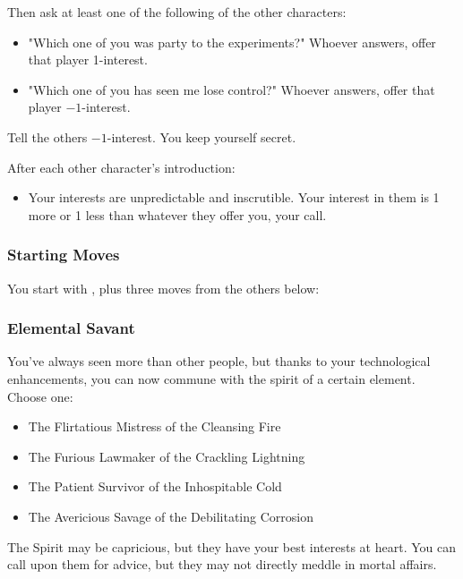 Then ask at least one of the following of the other characters:
\begin{itemize}
\item "Which one of you was party to the experiments?" Whoever answers, offer that player 1-interest.
\item "Which one of you has seen me lose control?" Whoever answers, offer that player $-1$-interest.
\end{itemize}
Tell the others $-1$-interest. You keep yourself secret.

After each other character's introduction:
\begin{itemize}
\item Your interests are unpredictable and inscrutible. Your interest in them is 1 more or 1 less than whatever they offer you, your call.
\end{itemize}

\subsubsection{Starting Moves}
You start with , plus three moves from the others below:

\subsubsection{Elemental Savant}\label{sec:Elemental Savant}
You've always seen more than other people, but thanks to your technological enhancements, you can now commune with the spirit of a certain element. Choose one:
\begin{itemize}
\item The Flirtatious Mistress of the Cleansing Fire
\item The Furious Lawmaker of the Crackling Lightning
\item The Patient Survivor of the Inhospitable Cold
\item The Avericious Savage of the Debilitating Corrosion
\end{itemize}
The Spirit may be capricious, but they have your best interests at heart. You can call upon them for advice, but they may not directly meddle in mortal affairs.



